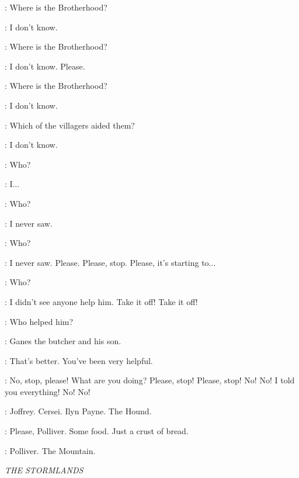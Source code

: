 \TICKLER: Where is the Brotherhood? 

\TICKLER: I don't know. 


\TICKLER: Where is the Brotherhood? 

\PRISONER: I don't know. Please. 

\TICKLER: Where is the Brotherhood? 

\PRISONER: I don't know. 

\TICKLER: Which of the villagers aided them? 

\PRISONER: I don't know. 

\TICKLER: Who? 


\PRISONER: I$\ldots$  

\TICKLER: Who? 

\PRISONER: I never saw. 

\TICKLER: Who? 

\PRISONER: I never saw. Please. Please, stop. Please, it's starting to$\ldots$  

\TICKLER: Who? 

\PRISONER: I didn't see anyone help him. Take it off! Take it off! 

\TICKLER: Who helped him? 

\PRISONER: Ganes the butcher and his son.

\TICKLER: That's better. You've been very helpful. 


\PRISONER: No, stop, please! What are you doing? Please, stop! Please, stop! No! No! I told you everything! No! No! 


\ARYA: Joffrey. Cersei. Ilyn Payne. The Hound. 

\PEASANTWOMAN:  Please, Polliver. Some food. Just a crust of bread. 


\ARYA: Polliver. The Mountain. 



\scene

\textit{THE STORMLANDS} 

